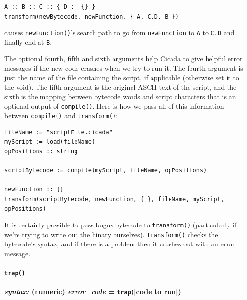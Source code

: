 \documentclass{article}
\newenvironment{code}{
       \begin{list}{}{
               \setlength{\leftmargin}{.4in}
               \setlength{\rightmargin}{0in}
               \setlength{\topsep}{.2in}
       }
       \small
       \item[] }
       { \end{list}   }
\begin{document}
\begin{code} \begin{verbatim}
A :: B :: C :: { D :: {} }
transform(newBytecode, newFunction, { A, C.D, B })
\end{verbatim} \end{code}

\noindent causes \verb#newFunction()#'s search path to go from \verb#newFunction# to \verb#A# to \verb#C.D# and finally end at \verb#B#.

The optional fourth, fifth and sixth arguments help Cicada to give helpful error messages if the new code crashes when we try to run it.  The fourth argument is just the name of the file containing the script, if applicable (otherwise set it to the void).  The fifth argument is the original ASCII text of the script, and the sixth is the mapping between bytecode words and script characters that is an optional output of \verb#compile()#.  Here is how we pass all of this information between \verb#compile()# and \verb#transform()#:

\begin{code} \begin{verbatim}
fileName := "scriptFile.cicada"
myScript := load(fileName)
opPositions :: string

scriptBytecode := compile(myScript, fileName, opPositions)

newFunction :: {}
transform(scriptBytecode, newFunction, { }, fileName, myScript, opPositions)
\end{verbatim} \end{code}

It is certainly possible to pass bogus bytecode to \verb#transform()# (particularly if we're trying to write out the binary ourselves).  \verb#transform()# checks the bytecode's syntax, and if there is a problem then it crashes out with an error message.\\

  





\paragraph{\texttt{trap()}\\\\
\normalfont \emph{syntax: } (numeric) \emph{error\_code} = \texttt{trap}([code to run])\\\\}
 
\end{document}
